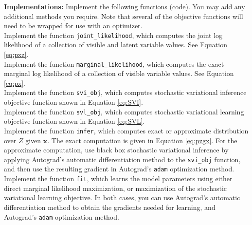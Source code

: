 \documentclass[11pt]{article}
\newcommand{\mbf}[1]{{\mathbf{#1}}}
\begin{document}
\begin{problem}{30} \textbf{Implementations:} Implement the following functions (code). You may add
	any additional methods you require. Note that several of the objective functions will need to be wrapped
	for use with an optimizer.\\

 Implement the function \verb|joint_likelihood|, which computes the joint log likelihood
of a collection of visible and latent variable values. See Equation \ref{eq:pxz}.\\

 Implement the function \verb|marginal_likelihood|, which computes the exact marginal log likelihood
of a collection of visible variable values. See Equation \ref{eq:px}.\\

 Implement the function \verb|svi_obj|, which computes stochastic
variational inference objective function shown in Equation \ref{eq:SVI}.\\

 Implement the function \verb|svl_obj|, which computes stochastic
variational learning objective function shown in Equation \ref{eq:SVL}.\\

 Implement the function \verb|infer|, which computes 
exact or approximate distribution over $Z$ given $\mbf{x}$. The
exact computation is given in Equation \ref{eq:pzgx}. 
For the approximate computation, use black box stochastic variational
inference by applying Autograd's automatic differentiation method to 
the \verb|svi_obj| function, and  then use the resulting  gradient in 
Autograd's \verb|adam| optimization method.\\

 Implement the function \verb|fit|, which learns the
model parameters using either direct marginal likelihood maximization,
or maximization of the stochastic variational learning objective.
In both cases, you can use Autograd's automatic differentiation method
to obtain the gradients needed for learning, and Autograd's
\verb|adam| optimization method. 
\end{problem}
\end{document}
